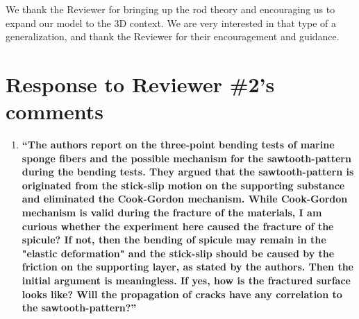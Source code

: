 \documentclass[11pt,letterpaper]{report}
\begin{document}
\begin{enumerate}[label=\textit{1.\arabic*},wide, labelwidth=!, labelindent=0pt]
We thank the Reviewer for bringing up the rod theory and encouraging us to expand our model to the 3D context. We are very interested in that type of a generalization, and thank the Reviewer for their encouragement and guidance.






\clearpage

\section*{Response to Reviewer \#2's comments}
\label{rev2}

\begin{enumerate}[label=\textit{2.\arabic*},wide, labelindent=0pt]

\item \label{r2c1}{\bf ``The authors report on the three-point bending tests of marine sponge fibers and the possible mechanism for the sawtooth-pattern during the bending tests. They argued that the sawtooth-pattern is originated from the stick-slip motion on the supporting substance and eliminated the Cook-Gordon mechanism.
While Cook-Gordon mechanism is valid during the fracture of the materials, I am curious whether the experiment here caused the fracture of the spicule?
If not, then the bending of spicule may remain in the "elastic deformation" and the stick-slip should be caused by the friction on the supporting layer, as stated by the authors. Then the initial argument is meaningless.
If yes, how is the fractured surface looks like? Will the propagation of cracks have any correlation to the sawtooth-pattern?''}




\end{enumerate}
\end{enumerate}
\end{document}
